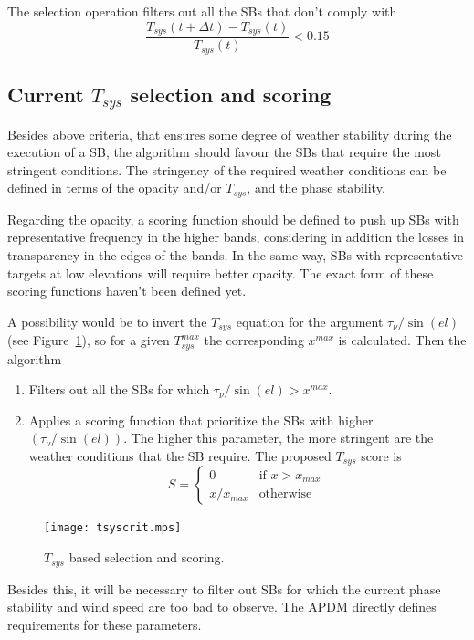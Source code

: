 \documentclass{article}
\begin{document}
The selection operation filters out all the SBs that don't comply with
$$
\frac{T_{sys}(t+\Delta t) - T_{sys}(t)}{T_{sys}(t)} < 0.15
$$

\subsection{Current $T_{sys}$ selection and scoring}

Besides above criteria, that ensures some degree of weather stability during the execution
of a SB, the algorithm should
favour the SBs that require the most stringent conditions. The stringency of the
required weather conditions can be defined in terms of the opacity and/or $T_{sys}$,
and the phase stability.

Regarding the opacity, a scoring function should be defined to push up SBs with
representative frequency in the higher bands, considering in addition the losses in transparency
in the edges of the bands. In the same way, SBs with representative targets
at low elevations will require better opacity. The exact form of these scoring functions
haven't been defined yet.

A possibility would be to invert the $T_{sys}$ equation for the argument $\tau_\nu/\sin(el)$
(see Figure~\ref{fig:tsyscrit}),
so for a given $T_{sys}^{max}$ the corresponding $x^{max}$ is calculated.
Then the algorithm
\begin{enumerate}
\item Filters out all the SBs for which $\tau_\nu/\sin(el) > x^{max}$.
\item Applies a scoring function that prioritize the SBs with higher
$(\tau_\nu/\sin(el))$. The higher this parameter, the more stringent are 
the weather conditions that the SB require. The proposed $T_{sys}$ score is
$$
   S = \left\{ \begin{array}{ll}
               0 & \text{if $x > x_{max}$} \\
               x / x_{max} & \text{otherwise}
               \end{array}
       \right . \
$$
\end{enumerate}

\begin{figure}
\texttt{[image: tsyscrit.mps]}
\caption{$T_{sys}$ based selection and scoring.}
\label{fig:tsyscrit}
\end{figure}


Besides this, it will be necessary to filter out SBs for which the
current phase stability  and wind speed are too bad to observe.
The APDM directly defines requirements for these parameters.
\end{document}
